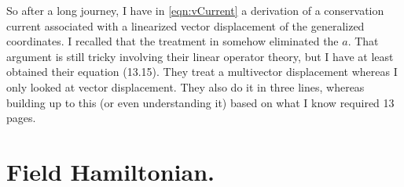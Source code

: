 \documentclass{article}
\begin{document}
So after a long journey, I have in
\ref{eqn:vCurrent}
a derivation of a conservation current associated
with 
a linearized vector displacement of the generalized coordinates.  I 
recalled that the treatment in
\cite{doran2003gap} somehow eliminated the $a$.  That argument is still tricky involving
their linear operator theory, but I have at least obtained their equation (13.15).
They treat a multivector displacement whereas I only looked at
vector displacement.  They also do it in three lines, whereas building up to this
(or even understanding it) based on what I know required 13 pages.

\section{ Field Hamiltonian. }
 


\end{document}
